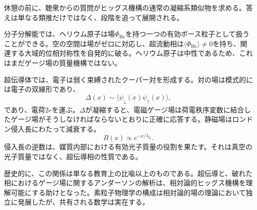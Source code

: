 休憩の前に、聴衆からの質問がヒッグス機構の通常の凝縮系類似物を求める。答えは単なる類推だけではなく、段階を追って展開される。

\begin{classroomqa}
\end{classroomqa}

分子分解能では、ヘリウム原子は場\(\Phi_{\mathrm{He}}\)を持つ一つの有効ボース粒子として扱うことができる。空の空間は場がゼロに対応し、超流動相は\(\langle\Phi_{\mathrm{He}}\rangle\ne0\)を持ち、関連する大域的位相対称性を自発的に破る。ヘリウム原子は中性であるため、これはまだゲージ場の質量機構ではない。

超伝導体では、電子は弱く束縛されたクーパー対を形成する。対の場は模式的には電子の双線形であり、
\begin{equation}
  \Delta(x)\sim\langle\psi_\downarrow(x)\psi_\uparrow(x)\rangle,
  \label{eq:l10-cooper-order-parameter}
\end{equation}
であり、電荷\(2e\)を運ぶ。\(\Delta\)が凝縮すると、電磁ゲージ場は荷電秩序変数に結合したゲージ場がそうしなければならないとおりに正確に応答する。静磁場はロンドン侵入長にわたって減衰する。
\begin{equation}
  B(x)\propto e^{-x/\lambda_L}.
  \label{eq:l10-meissner-screening}
\end{equation}
侵入長の逆数は、媒質内部における有効光子質量の役割を果たす。それは真空の光子質量ではなく、超伝導相の性質である。

\begin{classroomqa}
\end{classroomqa}

歴史的に、この関係は単なる教育上の比喩以上のものである。超伝導と、破れた相におけるゲージ場に関するアンダーソンの解析は、相対論的ヒッグス機構を理解可能にする助けとなった。素粒子物理学の構成は相対論的場の理論において独立に発展したが、共有される数学は実在する。

